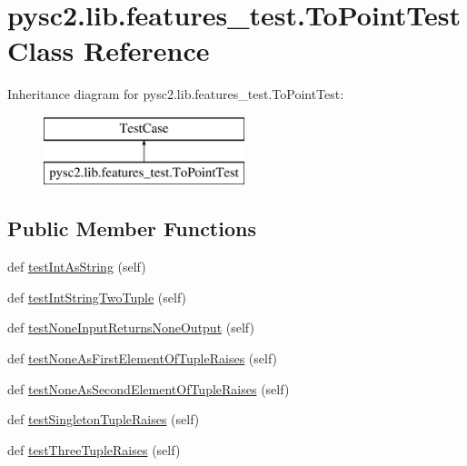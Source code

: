 \hypertarget{classpysc2_1_1lib_1_1features__test_1_1_to_point_test}{}\section{pysc2.\+lib.\+features\+\_\+test.\+To\+Point\+Test Class Reference}
\label{classpysc2_1_1lib_1_1features__test_1_1_to_point_test}
Inheritance diagram for pysc2.\+lib.\+features\+\_\+test.\+To\+Point\+Test\+:\begin{figure}[H]
\begin{center}
\leavevmode
\includegraphics[height=2.000000cm]{classpysc2_1_1lib_1_1features__test_1_1_to_point_test}
\end{center}
\end{figure}
\subsection*{Public Member Functions}
\begin{DoxyCompactItemize}
\item 
def \mbox{\hyperlink{classpysc2_1_1lib_1_1features__test_1_1_to_point_test_a14f6d3c6e3d2451942ef0c66a44451de}{test\+Int\+As\+String}} (self)
\item 
def \mbox{\hyperlink{classpysc2_1_1lib_1_1features__test_1_1_to_point_test_a43fc921aaffa77540dc976de5f3bd8cc}{test\+Int\+String\+Two\+Tuple}} (self)
\item 
def \mbox{\hyperlink{classpysc2_1_1lib_1_1features__test_1_1_to_point_test_a4ef667637e5ccc52e0b726ef1051aa64}{test\+None\+Input\+Returns\+None\+Output}} (self)
\item 
def \mbox{\hyperlink{classpysc2_1_1lib_1_1features__test_1_1_to_point_test_ac4272f810b837ad6728a8d1fd82e359f}{test\+None\+As\+First\+Element\+Of\+Tuple\+Raises}} (self)
\item 
def \mbox{\hyperlink{classpysc2_1_1lib_1_1features__test_1_1_to_point_test_a08a5a31ac47f983590735d071ee31188}{test\+None\+As\+Second\+Element\+Of\+Tuple\+Raises}} (self)
\item 
def \mbox{\hyperlink{classpysc2_1_1lib_1_1features__test_1_1_to_point_test_a58067e629bc6a94a0e7a8eaf00c1a654}{test\+Singleton\+Tuple\+Raises}} (self)
\item 
def \mbox{\hyperlink{classpysc2_1_1lib_1_1features__test_1_1_to_point_test_a78db58e7a01b6843e85527ed7782a1b8}{test\+Three\+Tuple\+Raises}} (self)
\end{DoxyCompactItemize}


